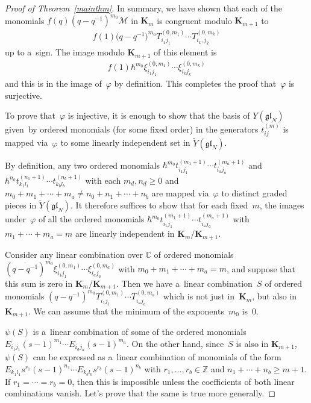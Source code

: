 \begin{proof}[Proof of Theorem~\ref{mainthm}]
In summary, we have shown that each of the monomials $f(q)(q-q^{-1})^{m_0}\mathcal{M}$ in $\mathbf{K}_m$ is congruent
modulo $\mathbf{K}_{m+1}$ to
\begin{gather*}
f(1)\big(q-q^{-1}\big)^{m_0} T_{i_1 j_1}^{(0,m_1)} \cdots T_{i_k,j_k}^{(0,m_k)}
\end{gather*}
up to a~sign.
The image modulo $\mathbf{K}_{m+1}$ of this element is
\begin{gather*}
f(1)\hbar^{m_0}\xi_{i_1 j_1}^{(0,m_1)} \cdots \xi_{i_k j_k}^{(0,m_k)}
\end{gather*}
and this is in the image of~$\varphi$ by def\/inition.
This completes the proof that~$\varphi$ is surjective.

To prove that~$\varphi$ is injective, it is enough to show that the basis of $Y(\mathfrak{gl}_N)$ given~by
ordered monomials (for some f\/ixed order) in the generators $t_{ij}^{(m)}$ is mapped via~$\varphi$ to some linearly
independent set in $\widetilde{Y}(\mathfrak{gl}_N)$.

By def\/inition, any two ordered monomials $\hbar^{m_0}t_{i_1 j_1}^{(m_1+1)} \cdots t_{i_a j_a}^{(m_a+1)}$ and
$\hbar^{n_0}t_{k_1 l_1}^{(n_1+1)} \cdots t_{k_b l_b}^{(n_b+1)}$ with each $m_d, n_d \geq 0$ and $m_0+m_1+\cdots+m_a \neq
n_0+n_1 + \cdots + n_b$ are mapped via~$\varphi$ to distinct graded pieces in $\widetilde{Y}(\mathfrak{gl}_N)$.
It therefore suf\/f\/ices to show that for each f\/ixed~$m$, the images under~$\varphi$ of all the ordered monomials
$\hbar^{m_0} t_{i_1 j_1}^{(m_1+1)} \cdots t_{i_a j_a}^{(m_a+1)}$ with $m_1+\cdots+m_a=m$ are linearly independent in
$\mathbf{K}_m/\mathbf{K}_{m+1}$.

Consider any linear combination over $\mathbb{C}$ of ordered monomials $(\overline{q-q^{-1}})^{m_0}\xi_{i_1
j_1}^{(0,m_1)} \cdots \xi_{i_a j_a}^{(0,m_a)}$ with $m_0+m_1+\cdots+m_a=m$, and suppose that this sum is zero in
$\mathbf{K}_m/\mathbf{K}_{m+1}$.
Then we have a~linear combination~$S$ of ordered monomials $(q-q^{-1})^{m_0}T_{i_1 j_1}^{(0,m_1)} \cdots T_{i_a
j_a}^{(0,m_a)}$ which is not just in~$\mathbf{K}_m$, but also in~$\mathbf{K}_{m+1}$.
We can assume that the minimum of the exponents~$m_0$ is~$0$.

$\psi(S)$ is a~linear combination of some of the ordered monomials $E_{i_1 j_1}(s-1)^{m_1} \cdots E_{i_a j_a}
(s-1)^{m_a}$.
On the other hand, since~$S$ is also in $\mathbf{K}_{m+1}$, $\psi(S)$ can be expressed as a~linear combination of
monomials of the form $E_{k_1 l_1} s^{r_1} (s-1)^{n_1} \cdots E_{k_b l_b} s^{r_b} (s-1)^{n_b}$ with $r_1,\ldots,r_b \in
\mathbb{Z}$ and $n_1+\cdots+n_b \geq m+1$.
If $r_1 = \cdots = r_b=0$, then this is impossible unless the coef\/f\/icients of both linear combinations vanish.
Let's prove that the same is true more generally.


\end{proof}
